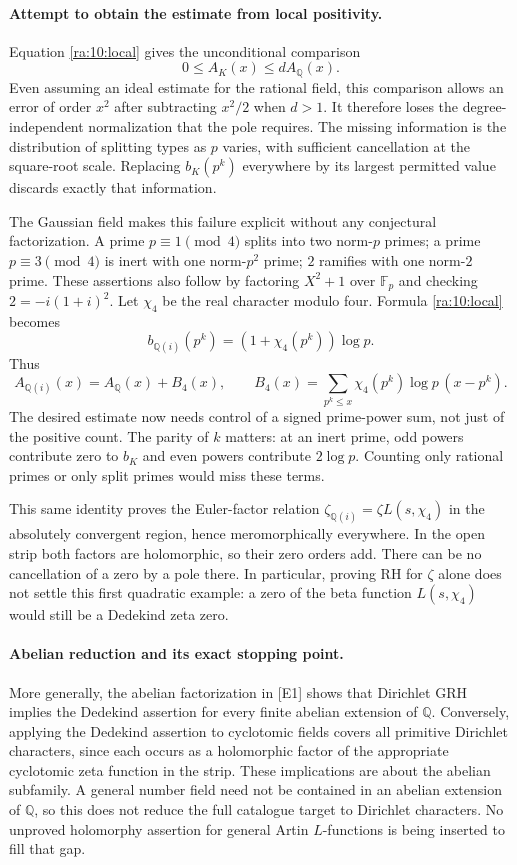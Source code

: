 \documentclass[11pt]{article}
\begin{document}
\paragraph{Attempt to obtain the estimate from local positivity.}
Equation \eqref{ra:10:local} gives the unconditional comparison
\[
 0\le A_K(x)\le dA_{\mathbb Q}(x).
\]
Even assuming an ideal estimate for the rational field, this comparison
allows an error of order $x^2$ after subtracting $x^2/2$ when $d>1$.
It therefore loses the degree-independent normalization that the pole
requires. The missing information is the distribution of splitting types
as $p$ varies, with sufficient cancellation at the square-root scale.
Replacing $b_K(p^k)$ everywhere by its largest permitted value discards
exactly that information.

The Gaussian field makes this failure explicit without any conjectural
factorization. A prime $p\equiv1\pmod4$ splits into two norm-$p$ primes;
a prime $p\equiv3\pmod4$ is inert with one norm-$p^2$ prime; $2$ ramifies
with one norm-$2$ prime. These assertions also follow by factoring
$X^2+1$ over $\mathbb F_p$ and checking $2=-i(1+i)^2$.
Let $\chi_4$ be the real character modulo four. Formula
\eqref{ra:10:local} becomes
\[
 b_{\mathbb Q(i)}(p^k)=(1+\chi_4(p^k))\log p.
\]
Thus
\[
 A_{\mathbb Q(i)}(x)=A_{\mathbb Q}(x)+B_4(x),\qquad
 B_4(x)=\sum_{p^k\le x}\chi_4(p^k)\log p\,(x-p^k).
\]
The desired estimate now needs control of a signed prime-power sum, not
just of the positive count. The parity of $k$ matters: at an inert prime,
odd powers contribute zero to $b_K$ and even powers contribute $2\log p$.
Counting only rational primes or only split primes would miss these terms.

This same identity proves the Euler-factor relation
$\zeta_{\mathbb Q(i)}=\zeta L(s,\chi_4)$ in the absolutely convergent
region, hence meromorphically everywhere. In the open strip both factors
are holomorphic, so their zero orders add. There can be no cancellation
of a zero by a pole there. In particular, proving RH for $\zeta$ alone
does not settle this first quadratic example: a zero of the beta function
$L(s,\chi_4)$ would still be a Dedekind zeta zero.

\paragraph{Abelian reduction and its exact stopping point.}
More generally, the abelian factorization in [E1] shows that Dirichlet GRH
implies the Dedekind assertion for every finite abelian extension of
$\mathbb Q$. Conversely, applying the Dedekind assertion to cyclotomic
fields covers all primitive Dirichlet characters, since each occurs as
a holomorphic factor of the appropriate cyclotomic zeta function in the
strip. These implications are about the abelian subfamily. A general
number field need not be contained in an abelian extension of $\mathbb Q$,
so this does not reduce the full catalogue target to Dirichlet characters.
No unproved holomorphy assertion for general Artin $L$-functions is being
inserted to fill that gap.
\end{document}
